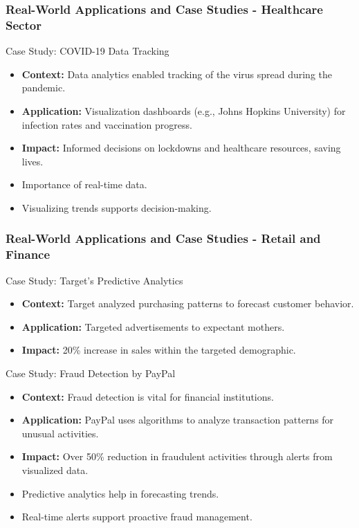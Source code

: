 \documentclass{beamer}
\begin{document}
\begin{frame}[fragile]
    \frametitle{Real-World Applications and Case Studies - Healthcare Sector}
    \begin{block}{Case Study: COVID-19 Data Tracking}
        \begin{itemize}
            \item \textbf{Context:} Data analytics enabled tracking of the virus spread during the pandemic.
            \item \textbf{Application:} Visualization dashboards (e.g., Johns Hopkins University) for infection rates and vaccination progress.
            \item \textbf{Impact:} Informed decisions on lockdowns and healthcare resources, saving lives.
        \end{itemize}
    \end{block}
    \begin{itemize}
        \item Importance of real-time data.
        \item Visualizing trends supports decision-making.
    \end{itemize}
\end{frame}

\begin{frame}[fragile]
    \frametitle{Real-World Applications and Case Studies - Retail and Finance}
    \begin{block}{Case Study: Target’s Predictive Analytics}
        \begin{itemize}
            \item \textbf{Context:} Target analyzed purchasing patterns to forecast customer behavior.
            \item \textbf{Application:} Targeted advertisements to expectant mothers.
            \item \textbf{Impact:} 20\% increase in sales within the targeted demographic.
        \end{itemize}
    \end{block}
    
    \begin{block}{Case Study: Fraud Detection by PayPal}
        \begin{itemize}
            \item \textbf{Context:} Fraud detection is vital for financial institutions.
            \item \textbf{Application:} PayPal uses algorithms to analyze transaction patterns for unusual activities.
            \item \textbf{Impact:} Over 50\% reduction in fraudulent activities through alerts from visualized data.
        \end{itemize}
    \end{block}
    
    \begin{itemize}
        \item Predictive analytics help in forecasting trends.
        \item Real-time alerts support proactive fraud management.
    \end{itemize}
\end{frame}
\end{document}
